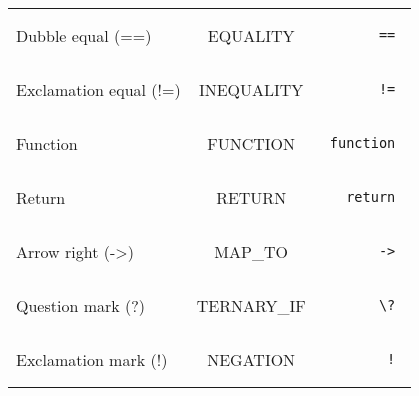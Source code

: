 \documentclass[a4paper,10pt]{article}
\begin{document}
\begin{tabular}{|l|c|r|}
  Dubble equal (==) & EQUALITY & \begin{minipage}{2in} \begin{verbatim} == \end{verbatim} \end{minipage} \\
  Exclamation equal (!=) & INEQUALITY & \begin{minipage}{2in} \begin{verbatim} != \end{verbatim} \end{minipage} \\
  Function & FUNCTION & \begin{minipage}{2in} \begin{verbatim} function \end{verbatim} \end{minipage} \\
  Return & RETURN & \begin{minipage}{2in} \begin{verbatim} return \end{verbatim} \end{minipage} \\
  Arrow right (->) & MAP\_TO & \begin{minipage}{2in} \begin{verbatim} -> \end{verbatim} \end{minipage} \\
  Question mark (?) & TERNARY\_IF & \begin{minipage}{2in} \begin{verbatim} \? \end{verbatim} \end{minipage} \\
  Exclamation mark (!) & NEGATION & \begin{minipage}{2in} \begin{verbatim} ! \end{verbatim} \end{minipage} \\
\hline
\end{tabular}
\end{document}
